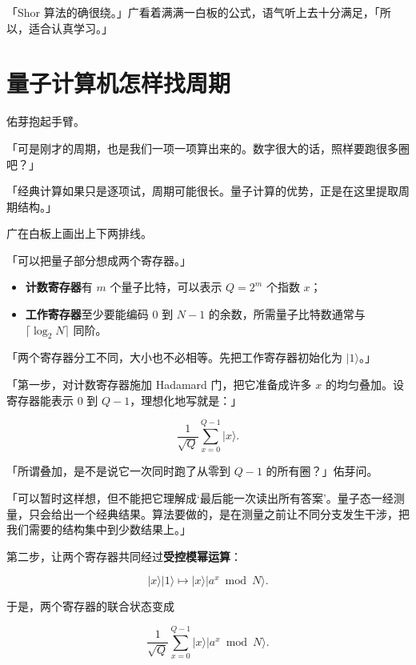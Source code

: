「Shor 算法的确很绕。」广看着满满一白板的公式，语气听上去十分满足，「所以，适合认真学习。」

\section{量子计算机怎样找周期}

佑芽抱起手臂。

「可是刚才的周期，也是我们一项一项算出来的。数字很大的话，照样要跑很多圈吧？」

「经典计算如果只是逐项试，周期可能很长。量子计算的优势，正是在这里提取周期结构。」

广在白板上画出上下两排线。

「可以把量子部分想成两个寄存器。」

\begin{itemize}[leftmargin=2em]
  \item \textbf{计数寄存器}有 $m$ 个量子比特，可以表示 $Q=2^m$ 个指数 $x$；
  \item \textbf{工作寄存器}至少要能编码 $0$ 到 $N-1$ 的余数，所需量子比特数通常与 $\lceil\log_2N\rceil$ 同阶。
\end{itemize}

「两个寄存器分工不同，大小也不必相等。先把工作寄存器初始化为 $\lvert1\rangle$。」

「第一步，对计数寄存器施加 Hadamard 门，把它准备成许多 $x$ 的均匀叠加。设寄存器能表示 $0$ 到 $Q-1$，理想化地写就是：」

\begin{equation}
\frac{1}{\sqrt{Q}}\sum_{x=0}^{Q-1}\lvert x\rangle.
\end{equation}

「所谓叠加，是不是说它一次同时跑了从零到 $Q-1$ 的所有圈？」佑芽问。

「可以暂时这样想，但不能把它理解成‘最后能一次读出所有答案’。量子态一经测量，只会给出一个经典结果。算法要做的，是在测量之前让不同分支发生干涉，把我们需要的结构集中到少数结果上。」

第二步，让两个寄存器共同经过\textbf{受控模幂运算}：

\begin{equation}
\lvert x\rangle\lvert 1\rangle
\longmapsto
\lvert x\rangle\lvert a^x \bmod N\rangle.
\end{equation}

于是，两个寄存器的联合状态变成

\begin{equation}
\frac{1}{\sqrt{Q}}\sum_{x=0}^{Q-1}
\lvert x\rangle\lvert a^x\bmod N\rangle.
\end{equation}

